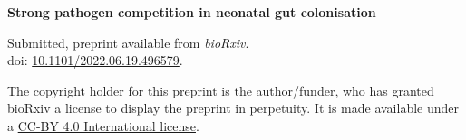 \vspace{10pt}
\noindent\textbf{Strong pathogen competition in neonatal gut colonisation}

\vspace{10pt}
\noindent Submitted, preprint available from \textit{bioRxiv}.
\\doi: \href{https://doi.org/10.1101/2022.06.19.496579}{10.1101/2022.06.19.496579}.

\vspace{60pt}
\noindent
The copyright holder for this preprint is the author/funder, who has
granted bioRxiv a license to display the preprint in perpetuity. It is
made available under a \href{http://creativecommons.org/licenses/by/4.0/}{CC-BY 4.0 International license}.

\cleardoublepage


















\restoregeometry

%
